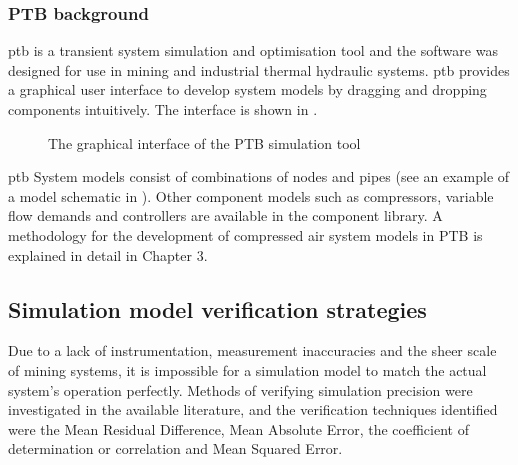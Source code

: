  \subsubsection{PTB background}
 \gls*{ptb} is a transient system simulation and optimisation tool and the software was designed for use in mining and industrial thermal hydraulic systems. \gls{ptb} provides a graphical user interface to develop system models by dragging and dropping components intuitively. The interface is shown in .
 \par 
\begin{figure}[h!]
 	\centering
 	\caption{The graphical interface of the PTB simulation tool}
 	\label{fig: PTB UI}
 \end{figure}
\gls{ptb} System models consist of combinations of nodes and pipes (see an example of a model schematic in ). Other component models such as compressors, variable flow demands and controllers are available in the component library. A methodology for the development of compressed air system models in PTB is explained in detail in Chapter 3.
 	\subsection{Simulation model verification strategies}\label{VerificationLit}
 	Due to a lack of instrumentation, measurement inaccuracies and the sheer scale of mining systems, it is impossible for a simulation model to match the actual system's operation perfectly. Methods of verifying simulation precision were investigated in the available literature, and the verification techniques identified were the Mean Residual Difference, Mean Absolute Error, the coefficient of determination or correlation and Mean Squared Error.%
